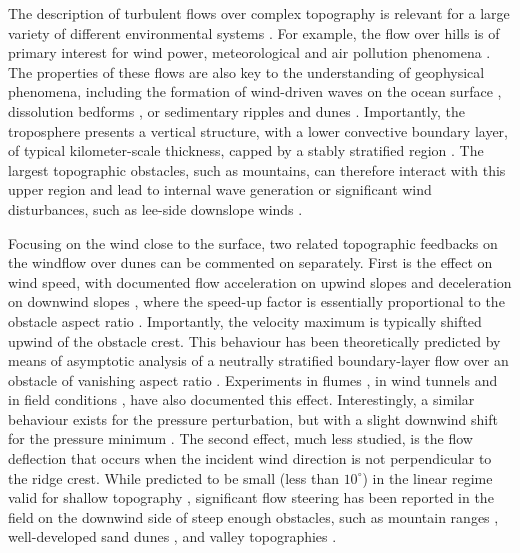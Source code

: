 The description of turbulent flows over complex topography is relevant for a large variety of different environmental systems \citep{Finnigan2020}. For example, the flow over hills is of primary interest for wind power, meteorological and air pollution phenomena \citep{Taylor1987}. The properties of these flows are also key to the understanding of geophysical phenomena, including the formation of wind-driven waves on the ocean surface \citep{Sullivan2010}, dissolution bedforms \citep{Claudin2017}, or sedimentary ripples and dunes \citep{Charru2013, Courrech2015}. Importantly, the troposphere presents a vertical structure, with a lower convective boundary layer, of typical kilometer-scale thickness, capped by a stably stratified region \citep{Stull1988}. The largest topographic obstacles, such as mountains, can therefore interact with this upper region and lead to internal wave generation or significant wind disturbances, such as lee-side downslope winds \citep{Durran1990}.

Focusing on the wind close to the surface, two related topographic feedbacks on the windflow over dunes can be commented on separately. First is the effect on wind speed, with documented flow acceleration on upwind slopes \citep{Weaver2011} and deceleration on downwind slopes \citep{Baddock2007}, where the speed-up factor is essentially proportional to the obstacle aspect ratio \citep{Jackson1975}. Importantly, the velocity maximum is typically shifted upwind of the obstacle crest. This behaviour has been theoretically predicted by means of asymptotic analysis of a neutrally stratified boundary-layer flow over an obstacle of vanishing aspect ratio \citep{Jackson1975, Mason1979, Sykes1980, Hunt1988, Belcher1998}. Experiments in flumes \citep{Zilker1977, Zilker1979, Frederick1988, Poggi2007, Bristow2022}, in wind tunnels \citep{Gong1989, Finnigan1990, Gong1996} and in field conditions \citep{Taylor1987a, Claudin2013, Fernando2019, Lu2021}, have also documented this effect. Interestingly, a similar behaviour exists for the pressure perturbation, but with a slight downwind shift for the pressure minimum \citep{Claudin2021}. The second effect, much less studied, is the flow deflection that occurs when the incident wind direction is not perpendicular to the ridge crest. While predicted to be small (less than $10^{\circ}$) in the linear regime valid for shallow topography \citep{Gadal2019}, significant flow steering has been reported in the field on the downwind side of steep enough obstacles, such as mountain ranges \citep{Kim2000, Lewis2008, Fernando2019}, well-developed sand dunes \citep{Walker2009, Hesp2015, Walker2017, Smith2017, deWinter2020}, and valley topographies \citep{Wiggs2002, Garvey2005}.


